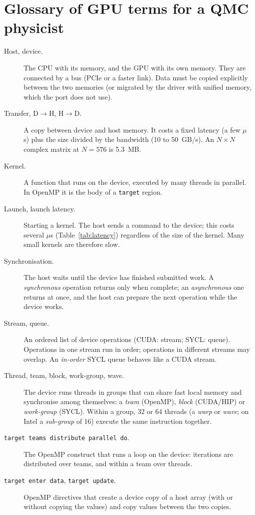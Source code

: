 \section{Glossary of GPU terms for a QMC physicist}
\label{app:glossary}

\begin{description}
\item[Host, device.] The CPU with its memory, and the GPU with its own memory. They are connected by a bus (PCIe or a faster link). Data must be copied explicitly between the two memories (or migrated by the driver with unified memory, which the port does not use).
\item[Transfer, D$\to$H, H$\to$D.] A copy between device and host memory. It costs a fixed latency (a few $\mu$s) plus the size divided by the bandwidth (10 to 50~GB/s). An $N\times N$ complex matrix at $N=576$ is 5.3~MB.
\item[Kernel.] A function that runs on the device, executed by many threads in parallel. In OpenMP it is the body of a \texttt{target} region.
\item[Launch, launch latency.] Starting a kernel. The host sends a command to the device; this costs several $\mu$s (Table~\ref{tab:latency}) regardless of the size of the kernel. Many small kernels are therefore slow.
\item[Synchronisation.] The host waits until the device has finished submitted work. A \emph{synchronous} operation returns only when complete; an \emph{asynchronous} one returns at once, and the host can prepare the next operation while the device works.
\item[Stream, queue.] An ordered list of device operations (CUDA: stream; SYCL: queue). Operations in one stream run in order; operations in different streams may overlap. An \emph{in-order} SYCL queue behaves like a CUDA stream.
\item[Thread, team, block, work-group, wave.] The device runs threads in groups that can share fast local memory and synchronise among themselves: a \emph{team} (OpenMP), \emph{block} (CUDA/HIP) or \emph{work-group} (SYCL). Within a group, 32 or 64 threads (a \emph{warp} or \emph{wave}; on Intel a \emph{sub-group} of 16) execute the same instruction together.
\item[\texttt{target teams distribute parallel do}.] The OpenMP construct that runs a loop on the device: iterations are distributed over teams, and within a team over threads.
\item[\texttt{target enter data}, \texttt{target update}.] OpenMP directives that create a device copy of a host array (with or without copying the values) and copy values between the two copies.

\end{description}
